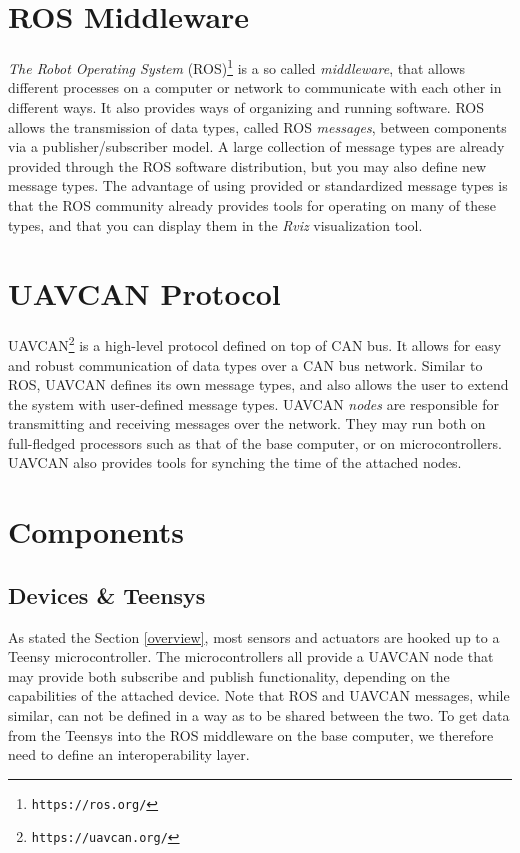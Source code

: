 \documentclass[9pt,technote]{IEEEtran} %
\begin{document}
\section{ROS Middleware}
\label{ros}

\textit{The Robot Operating System} (ROS)\footnote{\texttt{https://ros.org/}} is a so called \textit{middleware}, that allows different processes on
a computer or network to communicate with each other in different ways.
It also provides ways of organizing and running software. ROS allows the transmission of data types,
called ROS \textit{messages}, between components via a publisher/subscriber model.
A large collection of message types are already
provided through the ROS software distribution, but you may also define new message types.
The advantage of using provided or standardized message types is that the ROS community
already provides tools for operating on many of these types,
and that you can display them in the \textit{Rviz} visualization tool.

\section{UAVCAN Protocol}
\label{uavcan}

UAVCAN\footnote{\texttt{https://uavcan.org/}} is a high-level protocol defined on top of CAN bus. It allows for easy and robust
communication of data types over a CAN bus network. Similar to ROS, UAVCAN defines its
own message types, and also allows the user to extend the system with user-defined message types.
UAVCAN \textit{nodes} are responsible for transmitting and receiving messages over the network.
They may run both on full-fledged processors such as that of the base computer, or on microcontrollers.
UAVCAN also provides tools for synching the time of the attached nodes.

\section{Components}
\label{components}

\subsection{Devices \& Teensys}

As stated the Section \ref{overview}, most sensors and actuators are hooked up to a Teensy microcontroller.
The microcontrollers all provide a UAVCAN node that may provide both subscribe and publish
functionality, depending on the capabilities of the attached device.
Note that ROS and UAVCAN messages, while similar, can not be defined in a way
as to be shared between the two. To get data from the Teensys into the ROS middleware
on the base computer, we therefore need to define an interoperability layer.
\end{document}
